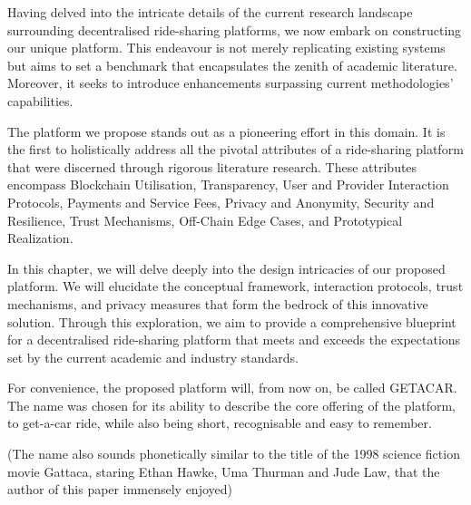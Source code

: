 Having delved into the intricate details of the current research landscape surrounding decentralised ride-sharing platforms, we now embark on constructing our unique platform. This endeavour is not merely replicating existing systems but aims to set a benchmark that encapsulates the zenith of academic literature. Moreover, it seeks to introduce enhancements surpassing current methodologies' capabilities.


The platform we propose stands out as a pioneering effort in this domain. It is the first to holistically address all the pivotal attributes of a ride-sharing platform that were discerned through rigorous literature research. These attributes encompass Blockchain Utilisation, Transparency, User and Provider Interaction Protocols, Payments and Service Fees, Privacy and Anonymity, Security and Resilience, Trust Mechanisms, Off-Chain Edge Cases, and Prototypical Realization.

In this chapter, we will delve deeply into the design intricacies of our proposed platform. We will elucidate the conceptual framework, interaction protocols, trust mechanisms, and privacy measures that form the bedrock of this innovative solution. Through this exploration, we aim to provide a comprehensive blueprint for a decentralised ride-sharing platform that meets and exceeds the expectations set by the current academic and industry standards.

For convenience, the proposed platform will, from now on, be called GETACAR. The name was chosen for its ability to describe the core offering of the platform, to get-a-car ride, while also being short, recognisable and easy to remember.

(The name also sounds phonetically similar to the title of the 1998 science fiction movie Gattaca, staring Ethan Hawke, Uma Thurman and Jude Law, that the author of this paper immensely enjoyed)